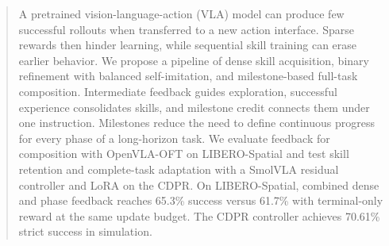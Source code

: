 \begin{abstract}
A pretrained vision-language-action (VLA) model can produce few successful rollouts when transferred to a new action interface. Sparse rewards then hinder learning, while sequential skill training can erase earlier behavior. We propose a pipeline of dense skill acquisition, binary refinement with balanced self-imitation, and milestone-based full-task composition. Intermediate feedback guides exploration, successful experience consolidates skills, and milestone credit connects them under one instruction. Milestones reduce the need to define continuous progress for every phase of a long-horizon task. We evaluate feedback for composition with OpenVLA-OFT on LIBERO-Spatial and test skill retention and complete-task adaptation with a SmolVLA residual controller and LoRA on the CDPR. On LIBERO-Spatial, combined dense and phase feedback reaches 65.3\% success versus 61.7\% with terminal-only reward at the same update budget. The CDPR controller achieves 70.61\% strict success in simulation.
\end{abstract}
